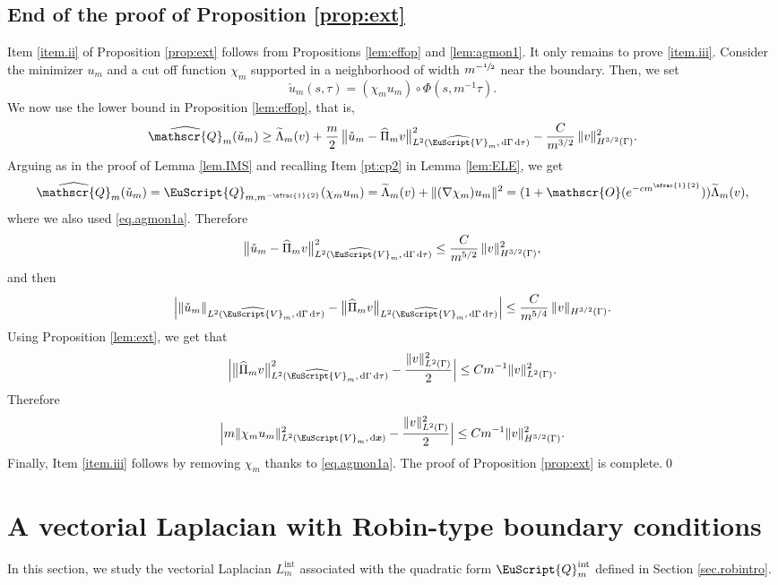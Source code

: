 \documentclass[JEP,XML,SOM,Unicode]{cedram}
\let\mathcal \EuScript
\newcommand{\scrO}{\mathscr{O}}
\newcommand{\scrQ}{\mathscr{Q}}
\newcommand{\cQ}{\mathcal{Q}}
\newcommand{\cV}{\mathcal{V}}
\newcommand{\intt}{\mathrm{int}}
\theoremstyle{plain}
\theoremstyle{definition}
\newcommand{\dx}{\mathrm{\,d}}
\newcommand{\bx}{{\boldsymbol x}}
\begin{document}
\subsection{End of the proof of Proposition \ref{prop:ext}}
Item \eqref{item.ii} of Proposition \ref{prop:ext} follows from Propositions \ref{lem:effop} and \ref{lem:agmon1}. It only remains to prove \eqref{item.iii}. Consider the minimizer $u_{m}$ and a cut off function $\chi_{m}$ supported in a neighborhood of width $m^{-\sfrac{1}{2}}$ near the boundary. Then, we set
\[\check u_{m}(s,\tau)= (\chi_{m} u_{m})\circ \Phi(s,m^{-1}\tau).\]
We now use the lower bound in Proposition \ref{lem:effop}, that is,
\[
\widehat{\scrQ}_m(\check u_{m})\geq \widetilde \Lambda_{m}(v)
+\frac{m}{2}\,
\bigl\|\check u_{m}-\widehat{\Pi}_m v\bigr\|^2_{L^2(\widehat{\cV}_m, \dx\Gamma\dx\tau)}-\frac{C}{m^{3/2}}\, \|v\|_{H^{3/2}(\Gamma)} ^2.
\]
Arguing as in the proof of Lemma \ref{lem.IMS} and recalling Item \eqref{pt:cp2} in Lemma \ref{lem:ELE}, we get
\[\widehat{\scrQ}_m(\check u_{m})=\cQ_{m, m^{-\sfrac{1}{2}}}(\chi_{m} u_{m})=\widetilde \Lambda_{m}(v)+\|(\nabla \chi_{m}) u_{m}\|^2=(1+\scrO(e^{-cm^{\sfrac{1}{2}}}))\widetilde \Lambda_{m}(v),\]
where we also used \eqref{eq.agmon1a}.
Therefore
\[\bigl\|\check u_{m}-\widehat{\Pi}_m v\bigr\|^2_{L^2(\widehat{\cV}_m, \dx\Gamma\dx\tau)}\leq \frac{C}{m^{5/2}}\, \|v\|_{H^{3/2}(\Gamma)} ^2,\]
and then
\[\left|\|\check u_{m}\|_{L^2(\widehat{\cV}_m, \dx\Gamma\dx\tau)}-\bigl\|\widehat{\Pi}_m v\bigr\|_{L^2(\widehat{\cV}_m, \dx\Gamma\dx\tau)}\right|\leq \frac{C}{m^{5/4}}\, \|v\|_{H^{3/2}(\Gamma)}.\]
Using Proposition \ref{lem:ext}, we get that
\[\Bigl|\bigl\|\widehat{\Pi}_m v\bigr\|^2_{L^2(\widehat{\cV}_m, \dx\Gamma\dx\tau)}-\frac{\|v\|^2_{L^2(\Gamma)}}{2}\Bigr|\leq Cm^{-1}\|v\|^2_{L^2(\Gamma)}.\]
Therefore
\[\Bigl |m\|\chi_{m} u_{m}\|^2_{L^2(\cV_m, \dx\bx)}-\frac{\|v\|^2_{L^2(\Gamma)}}{2} \Bigr|\leq Cm^{-1} \|v\|^2_{H^{3/2}(\Gamma)}.\]
Finally, Item \eqref{item.iii} follows by removing $\chi_{m}$ thanks to \eqref{eq.agmon1a}. The proof of Proposition \ref{prop:ext} is complete.\qed

\section{A vectorial Laplacian with Robin-type boundary conditions}\label{sec.3}
In this section, we study the vectorial Laplacian $L_m^\intt$ associated with the quadratic form $\cQ_m^\intt$ defined in Section \ref{sec.robintro}.
\end{document}
